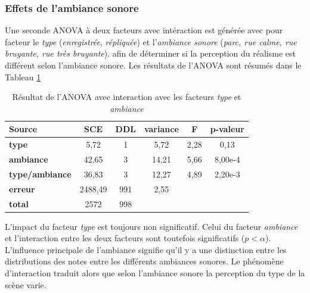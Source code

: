 \subsubsection{Effets de l'ambiance sonore}

Une seconde ANOVA à deux facteurs avec intéraction est générée avec pour facteur le \textit{type} (\textit{enregistrée}, \textit{répliquée}) et l'\textit{ambiance sonore} (\textit{parc, rue calme, rue bruyante, rue très bruyante}). afin de déterminer si la perception du réalisme est différent selon l'ambiance sonore. Les résultats de l'ANOVA sont résumés dans le Tableau \ref{tab:anova_ambiance}

\begin{table}[ht]
\centering
\begin{tabular}{lccccc}
\hline
\textbf{Source}     & \textbf{SCE} & \textbf{DDL} & \textbf{variance} & \textbf{F} & \textbf{p-valeur} \\
\hline
\textbf{type} & 5,72 & 1 & 5,72 & 2,28 & 0,13 \\
\hline
\textbf{ambiance} & 42,65 & 3 & 14,21 & 5,66 & 8,00e-4 \\
\hline
\textbf{type/ambiance} & 36,83 & 3 & 12,27 & 4,89 & 2,20e-3 \\
\hline
\textbf{erreur}      & 2488,49 & 991 & 2,55 & &  \\
\hline
\textbf{total}      & 2572 & 998 & & & \\
\hline
\end{tabular}
\caption{Résultat de l'ANOVA avec interaction avec les facteurs \textit{type} et \textit{ambiance}}
\label{tab:anova_ambiance}
\end{table}


L'impact du facteur \textit{type} est toujours non significatif. Celui du facteur \textit{ambiance} et l'interaction entre les deux facteurs sont toutefois significatifs ($p < \alpha$). L'influence principale de l'ambiance signifie qu'il y a une distinction entre les distributions des notes entre les différents ambiances sonores. Le phénomène d'interaction traduit alors que selon l'ambiance sonore la perception du type de la scène varie.

